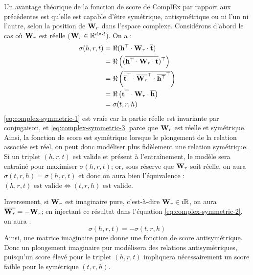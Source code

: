 Un avantage théorique de la fonction de score de ComplEx par rapport aux précédentes est qu'elle est capable d'être symétrique, antisymétrique ou ni l'un ni l'autre, selon la position de $\bf{W}_r$ dans l'espace complexe. Considérons d'abord le cas où $\bf{W}_r$ est réelle ($\bf{W}_r \in \R^{d \times d}$). On a :
\begin{align}
    \sigma(h, r, t) &= \Re(\bf{h^\top \cdot W}_r \cdot \compconj{\bf{t}}) \\
    &= \Re\left((\compconj{\bf{h^\top \cdot W}_r \cdot \compconj{\bf{t}}})^\top\right) \label{eq:complex-symmetric-1} \\
    &= \Re\left( \compconj{\compconj{\bf{t}}^\top \cdot \compconj{\bf{W}_r}^\top \cdot 
    \compconj{\bf{h^\top}}^\top}\right) \label{eq:complex-symmetric-2} \\
    &= \Re\left(\bf{t}^\top \cdot \bf{W}_r \cdot \compconj{\bf{h}}\right) \label{eq:complex-symmetric-3} \\
    &= \sigma(t, r, h)
\end{align}
\ref{eq:complex-symmetric-1} est vraie car la partie réelle est invariante par conjugaison, et \ref{eq:complex-symmetric-3} parce que $\bf{W}_r$ est réelle et symétrique. Ainsi, la fonction de score est symétrique lorsque le plongement de la relation associée est réel, on peut donc modéliser plus fidèlement une relation symétrique. Si un triplet $(h, r, t)$ est valide et présent à l'entraînement, le modèle sera entraîné pour maximiser $\sigma(h, r, t)$; or, sous réserve que $\bf{W}_r$ soit réelle, on aura $\sigma(t, r, h) = \sigma(h, r, t)$ et donc on aura bien l'équivalence : $(h, r, t) \text{ est valide} \iff (t, r, h) \text{ est valide}$.

Inversement, si $\bf{W}_r$ est imaginaire pure, c'est-à-dire $\bf{W}_r \in i\R$, on aura $\compconj{\bf{W}_r} = - \bf{W}_r$; en injectant ce résultat dans l'équation \ref{eq:complex-symmetric-2}, on aura :
\begin{equation}
    \sigma(h, r, t) = - \sigma(t, r, h)
\end{equation}
Ainsi, une matrice imaginaire pure donne une fonction de score antisymétrique. Donc un plongement imaginaire pur modélisera des relations antisymétriques, puisqu'un score élevé pour le triplet $(h, r, t)$ impliquera nécessairement un score faible pour le symétrique $(t, r, h)$.

